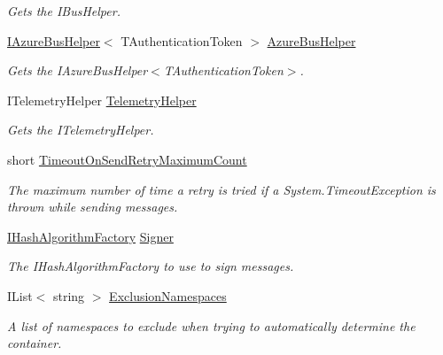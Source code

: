 \begin{DoxyCompactItemize}
\begin{DoxyCompactList}\small\item\em Gets the I\+Bus\+Helper. \end{DoxyCompactList}\item 
\hyperlink{interfaceCqrs_1_1Azure_1_1ServiceBus_1_1IAzureBusHelper}{I\+Azure\+Bus\+Helper}$<$ T\+Authentication\+Token $>$ \hyperlink{classCqrs_1_1Azure_1_1ServiceBus_1_1AzureServiceBus_a7c537c53265bf01d550982c04579493e_a7c537c53265bf01d550982c04579493e}{Azure\+Bus\+Helper}
\begin{DoxyCompactList}\small\item\em Gets the I\+Azure\+Bus\+Helper$<$\+T\+Authentication\+Token$>$. \end{DoxyCompactList}\item 
I\+Telemetry\+Helper \hyperlink{classCqrs_1_1Azure_1_1ServiceBus_1_1AzureServiceBus_af5f6d62cbdb3ad711ea42505491ffca3_af5f6d62cbdb3ad711ea42505491ffca3}{Telemetry\+Helper}
\begin{DoxyCompactList}\small\item\em Gets the I\+Telemetry\+Helper. \end{DoxyCompactList}\item 
short \hyperlink{classCqrs_1_1Azure_1_1ServiceBus_1_1AzureServiceBus_a4cc1f3523c56c534ff72c7da0e718482_a4cc1f3523c56c534ff72c7da0e718482}{Timeout\+On\+Send\+Retry\+Maximum\+Count}
\begin{DoxyCompactList}\small\item\em The maximum number of time a retry is tried if a System.\+Timeout\+Exception is thrown while sending messages. \end{DoxyCompactList}\item 
\hyperlink{interfaceCqrs_1_1Bus_1_1IHashAlgorithmFactory}{I\+Hash\+Algorithm\+Factory} \hyperlink{classCqrs_1_1Azure_1_1ServiceBus_1_1AzureServiceBus_aef1f30f0a2a1a4fcbab9a780bec4a185_aef1f30f0a2a1a4fcbab9a780bec4a185}{Signer}
\begin{DoxyCompactList}\small\item\em The I\+Hash\+Algorithm\+Factory to use to sign messages. \end{DoxyCompactList}\item 
I\+List$<$ string $>$ \hyperlink{classCqrs_1_1Azure_1_1ServiceBus_1_1AzureServiceBus_a1b1fe260b6437442543b15048f47abc6_a1b1fe260b6437442543b15048f47abc6}{Exclusion\+Namespaces}
\begin{DoxyCompactList}\small\item\em A list of namespaces to exclude when trying to automatically determine the container. \end{DoxyCompactList}\end{DoxyCompactItemize}


